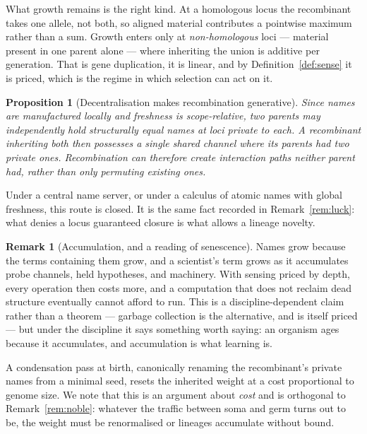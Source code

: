\documentclass[11pt]{article}
\theoremstyle{plain}
\newtheorem{proposition}[theorem]{Proposition}
\theoremstyle{definition}
\newtheorem{remark}[theorem]{Remark}
\begin{document}
What growth remains is the right kind. At a homologous locus the recombinant takes one allele, not
both, so aligned material contributes a pointwise maximum rather than a sum. Growth enters only at
\emph{non-homologous} loci --- material present in one parent alone --- where inheriting the union is
additive per generation. That is gene duplication, it is linear, and by
Definition~\ref{def:sense} it is priced, which is the regime in which selection can act on it.

\begin{proposition}[Decentralisation makes recombination generative]
\label{prop:accidental}
Since names are manufactured locally and freshness is scope-relative, two parents may independently
hold structurally equal names at loci private to each. A recombinant inheriting both then possesses a
single shared channel where its parents had two private ones. Recombination can therefore create
interaction paths neither parent had, rather than only permuting existing ones.
\end{proposition}

Under a central name server, or under a calculus of atomic names with global freshness, this route is
closed. It is the same fact recorded in Remark~\ref{rem:luck}: what denies a locus guaranteed closure
is what allows a lineage novelty.

\begin{remark}[Accumulation, and a reading of senescence]
\label{rem:aging}
Names grow because the terms containing them grow, and a scientist's term grows as it accumulates
probe channels, held hypotheses, and machinery. With sensing priced by depth, every operation then
costs more, and a computation that does not reclaim dead structure eventually cannot afford to run.
This is a discipline-dependent claim rather than a theorem --- garbage collection is the alternative,
and is itself priced --- but under the discipline it says something worth saying: an organism ages
because it accumulates, and accumulation is what learning is.

A condensation pass at birth, canonically renaming the recombinant's private names from a minimal
seed, resets the inherited weight at a cost proportional to genome size. We note that this is an
argument about \emph{cost} and is orthogonal to Remark~\ref{rem:noble}: whatever the traffic between
soma and germ turns out to be, the weight must be renormalised or lineages accumulate without bound.
\end{remark}
\end{document}
